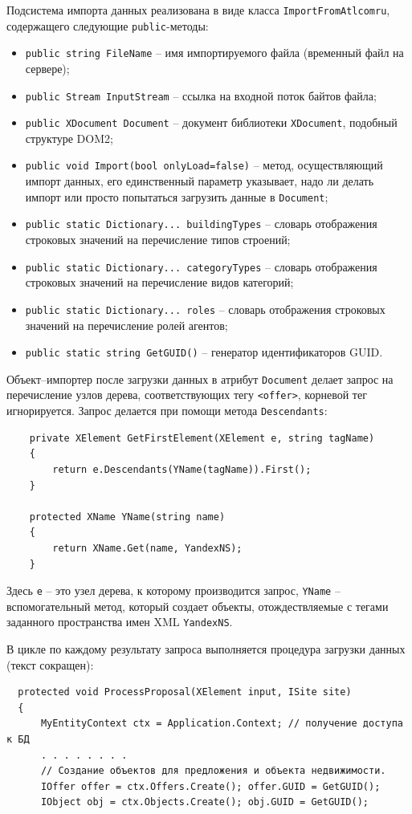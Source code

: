 \documentclass[a4paper,14pt,openany,final]{extreport} %
\begin{document}
{Подсистема импорта данных реализована в виде класса \verb|ImportFromAtlcomru|, содержащего следующие \verb|public|-методы:
\begin{itemize}[label={},leftmargin=0pt]
\item \verb|public string FileName| -- имя импортируемого файла (временный файл на сервере);
\item \verb|public Stream InputStream| -- ссылка на входной поток байтов файла;
\item \verb|public XDocument Document| -- документ библиотеки \verb|XDocument|, подобный структуре DOM2;
\item \verb|public void Import(bool onlyLoad=false)| -- метод, осуществляющий импорт данных, его единственный параметр указывает, надо ли делать импорт или просто попытаться загрузить данные в \verb|Document|;
\item \verb|public static Dictionary... buildingTypes| -- словарь отображения строковых значений на перечисление типов строений;
\item \verb|public static Dictionary... categoryTypes| -- словарь отображения строковых значений на перечисление видов категорий;
\item \verb|public static Dictionary... roles| -- словарь отображения строковых значений на перечисление ролей агентов;
\item \verb|public static string GetGUID()| -- генератор идентификаторов GUID.
\end{itemize}

Объект--импортер после загрузки данных в атрибут \verb|Document| делает запрос на перечисление узлов дерева, соответствующих тегу \verb|<offer>|, корневой тег игнорируется. Запрос делается при помощи метода \verb|Descendants|:
\begin{verbatim}
    private XElement GetFirstElement(XElement e, string tagName)
    {
        return e.Descendants(YName(tagName)).First();
    }

    protected XName YName(string name)
    {
        return XName.Get(name, YandexNS);
    }
\end{verbatim}
Здесь \verb|e| -- это узел дерева, к которому производится запрос, \verb|YName| -- вспомогательный метод, который создает объекты, отождествляемые с тегами заданного пространства имен XML \verb|YandexNS|.

В цикле по каждому результату запроса выполняется процедура загрузки данных (текст сокращен):
\begin{verbatim}
  protected void ProcessProposal(XElement input, ISite site)
  {
      MyEntityContext ctx = Application.Context; // получение доступа к БД
      . . . . . . . .
      // Создание объектов для предложения и объекта недвижимости.
      IOffer offer = ctx.Offers.Create(); offer.GUID = GetGUID();
      IObject obj = ctx.Objects.Create(); obj.GUID = GetGUID();


\end{verbatim}}
\end{document}
